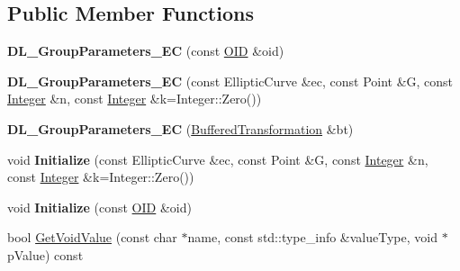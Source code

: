 \subsection*{Public Member Functions}
\begin{DoxyCompactItemize}
\item 
\hypertarget{class_d_l___group_parameters___e_c_a00924a42a5f08c76e130e9cadd40b132}{
{\bfseries DL\_\-GroupParameters\_\-EC} (const \hyperlink{class_o_i_d}{OID} \&oid)}
\label{class_d_l___group_parameters___e_c_a00924a42a5f08c76e130e9cadd40b132}

\item 
\hypertarget{class_d_l___group_parameters___e_c_aea3f752557db732e096fe92a508d8236}{
{\bfseries DL\_\-GroupParameters\_\-EC} (const EllipticCurve \&ec, const Point \&G, const \hyperlink{class_integer}{Integer} \&n, const \hyperlink{class_integer}{Integer} \&k=Integer::Zero())}
\label{class_d_l___group_parameters___e_c_aea3f752557db732e096fe92a508d8236}

\item 
\hypertarget{class_d_l___group_parameters___e_c_af31a18df3efb58a62866080dd8dc55a9}{
{\bfseries DL\_\-GroupParameters\_\-EC} (\hyperlink{class_buffered_transformation}{BufferedTransformation} \&bt)}
\label{class_d_l___group_parameters___e_c_af31a18df3efb58a62866080dd8dc55a9}

\item 
\hypertarget{class_d_l___group_parameters___e_c_ad3bd5f1e41ae0ae5c673a7f9d96a00a8}{
void {\bfseries Initialize} (const EllipticCurve \&ec, const Point \&G, const \hyperlink{class_integer}{Integer} \&n, const \hyperlink{class_integer}{Integer} \&k=Integer::Zero())}
\label{class_d_l___group_parameters___e_c_ad3bd5f1e41ae0ae5c673a7f9d96a00a8}

\item 
\hypertarget{class_d_l___group_parameters___e_c_a4fdb9f302a174b3bd9c299089b0dec50}{
void {\bfseries Initialize} (const \hyperlink{class_o_i_d}{OID} \&oid)}
\label{class_d_l___group_parameters___e_c_a4fdb9f302a174b3bd9c299089b0dec50}

\item 
\hypertarget{class_d_l___group_parameters___e_c_ae8d87127ad35ac8738e078069770d4fe}{
bool \hyperlink{class_d_l___group_parameters___e_c_ae8d87127ad35ac8738e078069770d4fe}{GetVoidValue} (const char $\ast$name, const std::type\_\-info \&valueType, void $\ast$pValue) const }
\label{class_d_l___group_parameters___e_c_ae8d87127ad35ac8738e078069770d4fe}


\end{DoxyCompactItemize}
